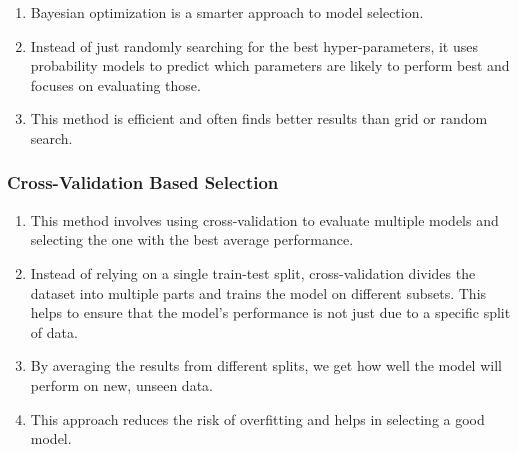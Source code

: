 \begin{enumerate}
    \item Bayesian optimization is a smarter approach to model selection.
    \hfill \cite{geeksforgeeks/machine-learning/model-selection-for-machine-learning}

    \item Instead of just randomly searching for the best hyper-parameters, it uses probability models to predict which parameters are likely to perform best and focuses on evaluating those.
    \hfill \cite{geeksforgeeks/machine-learning/model-selection-for-machine-learning}

    \item This method is efficient and often finds better results than grid or random search.
    \hfill \cite{geeksforgeeks/machine-learning/model-selection-for-machine-learning}
\end{enumerate}



\subsubsection{Cross-Validation Based Selection}

\begin{enumerate}
    \item This method involves using cross-validation to evaluate multiple models and selecting the one with the best average performance.
    \hfill \cite{geeksforgeeks/machine-learning/model-selection-for-machine-learning}

    \item Instead of relying on a single train-test split, cross-validation divides the dataset into multiple parts and trains the model on different subsets.
    This helps to ensure that the model’s performance is not just due to a specific split of data.
    \hfill \cite{geeksforgeeks/machine-learning/model-selection-for-machine-learning}

    \item By averaging the results from different splits, we get how well the model will perform on new, unseen data.
    \hfill \cite{geeksforgeeks/machine-learning/model-selection-for-machine-learning}

    \item This approach reduces the risk of overfitting and helps in selecting a good model.
    \hfill \cite{geeksforgeeks/machine-learning/model-selection-for-machine-learning}
\end{enumerate}







